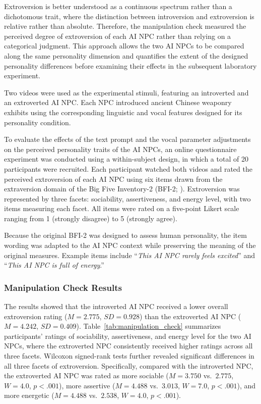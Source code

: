 \documentclass[a4paper,fleqn]{cas-sc}
\begin{document}
Extroversion is better understood as a continuous spectrum rather than a dichotomous trait, where the distinction between introversion and extroversion is relative rather than absolute. Therefore, the manipulation check measured the perceived degree of extroversion of each AI NPC rather than relying on a categorical judgment. This approach allows the two AI NPCs to be compared along the same personality dimension and quantifies the extent of the designed personality differences before examining their effects in the subsequent laboratory experiment.

Two videos were used as the experimental stimuli, featuring an introverted and an extroverted AI NPC. Each NPC introduced ancient Chinese weaponry exhibits using the corresponding linguistic and vocal features designed for its personality condition.

To evaluate the effects of the text prompt and the vocal parameter adjustments on the perceived personality traits of the AI NPCs, an online questionnaire experiment was conducted using a within-subject design, in which a total of 20 participants were recruited. Each participant watched both videos and rated the perceived extroversion of each AI NPC using six items drawn from the extraversion domain of the Big Five Inventory-2 (BFI-2; \cite{sotoNextBigFive2017}). Extroversion was represented by three facets: sociability, assertiveness, and energy level, with two items measuring each facet. All items were rated on a five-point Likert scale ranging from 1 (strongly disagree) to 5 (strongly agree).

Because the original BFI-2 was designed to assess human personality, the item wording was adapted to the AI NPC context while preserving the meaning of the original measures. Example items include ``\textit{This AI NPC rarely feels excited}'' and ``\textit{This AI NPC is full of energy}.''

\subsubsection{Manipulation Check Results}

The results showed that the introverted AI NPC received a lower overall extroversion rating ($M = 2.775$, $SD = 0.928$) than the extroverted AI NPC ($M = 4.242$, $SD = 0.409$). Table~\ref{tab:manipulation_check} summarizes participants' ratings of sociability, assertiveness, and energy level for the two AI NPCs, where the extroverted NPC consistently received higher ratings across all three facets. Wilcoxon signed-rank tests further revealed significant differences in all three facets of extroversion. Specifically, compared with the introverted NPC, the extroverted AI NPC was rated as more sociable ($M = 3.750$ vs.\ $2.775$, $W = 4.0$, $p < .001$), more assertive ($M = 4.488$ vs.\ $3.013$, $W = 7.0$, $p < .001$), and more energetic ($M = 4.488$ vs.\ $2.538$, $W = 4.0$, $p < .001$).
\end{document}
